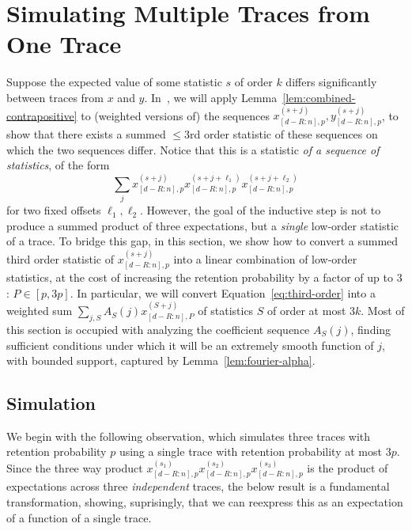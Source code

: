 \documentclass[11pt]{article}
\theoremstyle{plain}
\begin{document}
\section{Simulating Multiple Traces from One Trace}\label{sec:alpha}

Suppose the expected value of some statistic $s$ of order $k$ differs significantly between traces from $x$ and $y$. In~, we will apply Lemma~\ref{lem:combined-contrapositive} to (weighted versions of) the sequences $x^{(s+j)}_{[d-R:n],p},y^{(s+j)}_{[d-R:n],p}$, to show that there exists a summed $\leq 3$rd order statistic of these sequences on which the two sequences differ. Notice that this is a statistic \emph{of a sequence of statistics}, of the form
\begin{equation}
    \label{eq:third-order}
    \sum_{j} x^{(s+j)}_{[d-R:n],p} x^{(s+j+\ell_1)}_{[d-R:n],p}x^{(s+j+\ell_2)}_{[d-R:n],p}
\end{equation}
for two fixed offsets $\ell_1,\ell_2$. However, the goal of the inductive step is not to produce a summed product of three expectations, but a \emph{single} low-order statistic of a trace. To bridge this gap, in this section, we show how to convert a summed third order statistic of $x^{(s+j)}_{[d-R:n],p}$ into a linear combination of low-order statistics, at the cost of increasing the retention probability by a factor of up to $3$: $P\in [p,3p]$. In particular, we will convert Equation~\ref{eq:third-order} into a weighted sum $\sum_{j,S} A_S(j) x^{(S+j)}_{[d-R:n],P}$ of  statistics $S$ of order at most $3k$. Most of this section is occupied with analyzing the coefficient sequence $A_S(j)$, finding sufficient conditions under which it will be an extremely smooth function of $j$, with bounded support, captured by Lemma~\ref{lem:fourier-alpha}.

\subsection{Simulation}

We begin with the following observation, which simulates three traces with retention probability $p$ using a single trace with retention probability at most $3p$. Since the three way product $x^{(s_1)}_{[d-R:n],p} x^{(s_2)}_{[d-R:n],p}x^{(s_3)}_{[d-R:n],p}$ is the product of expectations across three \emph{independent} traces, the below result is a fundamental transformation, showing, suprisingly, that we can reexpress this as an expectation of a function of a single trace.
\end{document}

